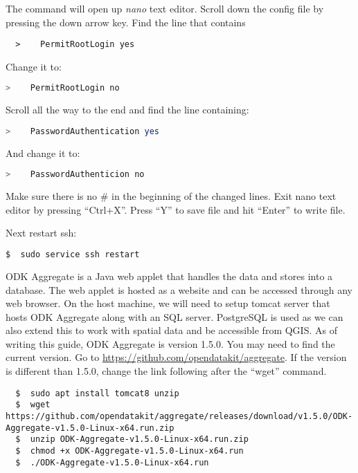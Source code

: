 \noindent
The command will open up \emph{nano} text editor. Scroll down the config file by pressing the down arrow key. Find the line that contains

\begin{lstlisting}
  >    PermitRootLogin yes
\end{lstlisting}

\noindent
Change it to:

\begin{lstlisting}[language=bash]
  >    PermitRootLogin no
\end{lstlisting}

\noindent
Scroll all the way to the end and find the line containing:

\begin{lstlisting}[language=bash]
  >    PasswordAuthentication yes
\end{lstlisting}

\noindent
And change it to:

\begin{lstlisting}[language=bash]
  >    PasswordAuthenticion no
\end{lstlisting}

\noindent
Make sure there is no \# in the beginning of the changed lines. Exit nano text editor by pressing ``Ctrl+X''. Press ``Y'' to save file and hit ``Enter'' to write file.

\noindent
Next restart ssh:

\begin{lstlisting}[language=bash]
  $  sudo service ssh restart
\end{lstlisting}


\noindent
ODK Aggregate is a Java web applet that handles the data and stores into a database. The web applet is hosted as a website and can be accessed through any web browser. On the host machine, we will need to setup tomcat server that hosts ODK Aggregate along with an SQL server. PostgreSQL is used as we can also extend this to work with spatial data and be accessible from QGIS. As of writing this guide, ODK Aggregate is version 1.5.0. You may need to find the current version. Go to \url{https://github.com/opendatakit/aggregate}. If the version is different than 1.5.0, change the link following after the ``wget'' command.

\begin{lstlisting}
  $  sudo apt install tomcat8 unzip
  $  wget https://github.com/opendatakit/aggregate/releases/download/v1.5.0/ODK-Aggregate-v1.5.0-Linux-x64.run.zip
  $  unzip ODK-Aggregate-v1.5.0-Linux-x64.run.zip
  $  chmod +x ODK-Aggregate-v1.5.0-Linux-x64.run
  $  ./ODK-Aggregate-v1.5.0-Linux-x64.run
\end{lstlisting}

